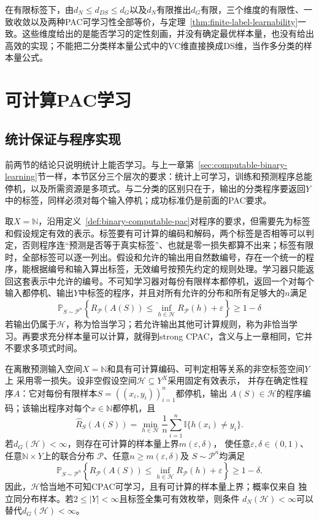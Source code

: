 在有限标签下，由$d_N\leq d_{DS}\leq d_G$以及$d_N$有限推出$d_G$有限，三个维度的有限性、一致收敛以及两种PAC可学习性全部等价，与定理~\ref{thm:finite-label-learnability}一致。这些维度给出的是能否学习的定性刻画，并没有确定最优样本量，也没有给出高效的实现；不能把二分类样本量公式中的VC维直接换成DS维，当作多分类的样本量公式。

\section{可计算PAC学习}
\label{sec:computable-multiclass-learning}

\subsection{统计保证与程序实现}

前两节的结论只说明统计上能否学习。与上一章第~\ref{sec:computable-binary-learning}节一样，本节区分三个层次的要求：统计上可学习，训练和预测程序总能停机，以及所需资源是多项式。与二分类的区别只在于，输出的分类程序要返回$Y$中的标签，同样必须对每个输入停机；成功标准仍是前面的PAC要求。

取$X=\mathbb N$，沿用定义~\ref{def:binary-computable-pac}对程序的要求，但需要先为标签和假设规定有效的表示。标签要有可计算的编码和解码，两个标签是否相等可以判定，否则程序连“预测是否等于真实标签”、也就是零一损失都算不出来；标签有限时，全部标签可以逐一列出。假设和允许的输出用自然数编号，存在一个统一的程序，能根据编号和输入算出标签，无效编号按预先约定的规则处理。学习器只能返回这套表示中允许的编号。不可知学习器对每份有限样本都停机，返回一个对每个输入都停机、输出$Y$中标签的程序，并且对所有允许的分布和所有足够大的$n$满足
\[
 \mathbb P_{S\sim\mathcal P^n}\!\left\{
 R_{\mathcal P}(A(S))\leq\inf_{h\in\mathcal H}R_{\mathcal P}(h)+\varepsilon
 \right\}\geq1-\delta
\]
若输出仍属于$\mathcal H$，称为恰当学习；若允许输出其他可计算规则，称为非恰当学习。再要求充分样本量可以计算，就得到strong CPAC，含义与上一章相同，它并不要求多项式时间。

\begin{theorem}[多分类可计算ERM的充分条件]
\label{thm:multiclass-computable-erm}
在离散预测输入空间$X=\mathbb N$和具有可计算编码、可判定相等关系的非空标签空间$Y$上
采用零一损失。设非空假设空间$\mathcal H\subseteq Y^X$采用固定有效表示，
并存在确定性程序$A$：它对每份有限样本$S=((x_i,y_i))_{i=1}^n$都停机，输出
$A(S)\in\mathcal H$的程序编码；该输出程序对每个$x\in\mathbb N$都停机，且
\[
 \hat R_S(A(S))
 =\min_{h\in\mathcal H}\frac1n\sum_{i=1}^n\mathbb I\{h(x_i)\neq y_i\}.
\]
若$d_G(\mathcal H)<\infty$，则存在可计算的样本量上界$m(\varepsilon,\delta)$，
使任意$\varepsilon,\delta\in(0,1)$、任意$\mathbb N\times Y$上的联合分布
$\mathcal P$、任意$n\geq m(\varepsilon,\delta)$及
$S\sim\mathcal P^n$均满足
\[
 \mathbb P_{S\sim\mathcal P^n}\left\{
 R_{\mathcal P}(A(S))
 \leq\inf_{h\in\mathcal H}R_{\mathcal P}(h)+\varepsilon
 \right\}\geq1-\delta.
\]
因此，$\mathcal H$恰当地不可知CPAC可学习，且有可计算的样本量上界；概率仅来自
独立同分布样本。若$2\leq|Y|<\infty$且标签全集可有效枚举，则条件
$d_N(\mathcal H)<\infty$可以替代$d_G(\mathcal H)<\infty$。
\end{theorem}

